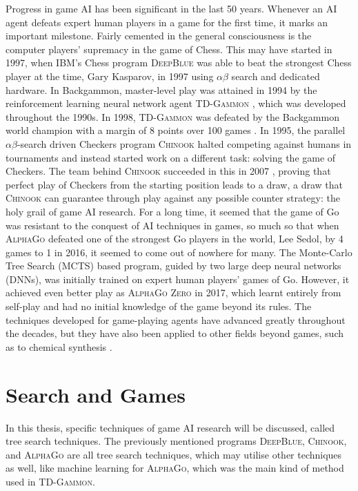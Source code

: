 Progress in game AI has been significant in the last 50 years. Whenever an AI agent defeats expert human players in a game for the first time, it marks an important milestone. Fairly cemented in the general consciousness is the computer players’ supremacy in the game of Chess. This may have started in 1997, when IBM’s Chess program \textsc{DeepBlue} \cite{Campbell2002} was able to beat the strongest Chess player at the time, Gary Kasparov, in 1997 using $\alpha\beta$ search and dedicated hardware. In Backgammon, master-level play was attained in 1994 by the reinforcement learning neural network agent \textsc{TD-Gammon} \cite{Tesauro1994}, which was developed throughout the 1990s. In 1998, \textsc{TD-Gammon} was defeated by the Backgammon world champion with a margin of 8 points over 100 games \cite{Tesauro2010}. In 1995, the parallel $\alpha\beta$-search driven Checkers program \textsc{Chinook} \cite{Schaeffer1992, Schaeffer1996} halted competing against humans in tournaments and instead started work on a different task: solving the game of Checkers. 
The team behind \textsc{Chinook} succeeded in this in 2007 \cite{Schaeffer2007}, proving that perfect play of Checkers from the starting position leads to a draw, a draw that \textsc{Chinook} can guarantee through play against any possible counter strategy: the holy grail of game AI research.
For a long time, it seemed that the game of Go was resistant to the conquest of AI techniques in games, so much so that when \textsc{AlphaGo} \cite{Silver2016} defeated one of the strongest Go players in the world, Lee Sedol, by 4 games to 1 in 2016, it seemed to come out of nowhere for many. The Monte-Carlo Tree Search (MCTS) \cite{Coulom2007} based program, guided by two large deep neural networks (DNNs), was initially trained on expert human players’ games of Go. However, it achieved even better play as \textsc{AlphaGo Zero} \cite{Silver2017} in 2017, which learnt entirely from self-play and had no initial knowledge of the game beyond its rules. The techniques developed for game-playing agents have advanced greatly throughout the decades, but they have also been applied to %
other fields beyond games, such as to chemical synthesis \cite{HeifetsJurisica2012, Franz2022}. %

\section{Search and Games}
\label{sec:introGameTreeSearch}
In this thesis, specific techniques of game AI research will be discussed, called tree search techniques. The previously mentioned programs \textsc{DeepBlue}, \textsc{Chinook}, and \textsc{AlphaGo} are all tree search techniques, which may utilise other techniques as well, like machine learning for \textsc{AlphaGo}, which was the main kind of method used in \textsc{TD-Gammon}.

